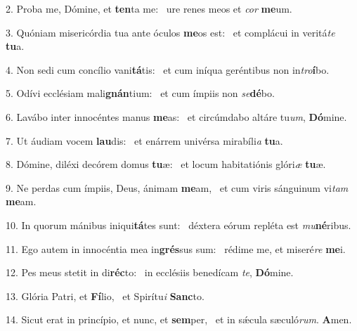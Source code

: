 2. Proba me, Dómine, et \textbf{ten}ta me: \ast\  ure renes meos et \textit{cor} \textbf{me}um.\

3. Quóniam misericórdia tua ante óculos \textbf{me}os est: \ast\  et complácui in veritá\textit{te} \textbf{tu}a.\

4. Non sedi cum concílio vani\textbf{tá}tis: \ast\  et cum iníqua geréntibus non in\textit{tro}\textbf{í}bo.\

5. Odívi ecclésiam mali\textbf{gnán}tium: \ast\  et cum ímpiis non \textit{se}\textbf{dé}bo.\

6. Lavábo inter innocéntes manus \textbf{me}as: \ast\  et circúmdabo altáre tu\textit{um}, \textbf{Dó}mine.\

7. Ut áudiam vocem \textbf{lau}dis: \ast\  et enárrem univérsa mirabíli\textit{a} \textbf{tu}a.\

8. Dómine, diléxi decórem domus \textbf{tu}æ: \ast\  et locum habitatiónis glóri\textit{æ} \textbf{tu}æ.\

9. Ne perdas cum ímpiis, Deus, ánimam \textbf{me}am, \ast\  et cum viris sánguinum vi\textit{tam} \textbf{me}am.\

10. In quorum mánibus iniqui\textbf{tá}tes sunt: \ast\  déxtera eórum repléta est \textit{mu}\textbf{né}ribus.\

11. Ego autem in innocéntia mea in\textbf{grés}sus sum: \ast\  rédime me, et miseré\textit{re} \textbf{me}i.\

12. Pes meus stetit in di\textbf{réc}to: \ast\  in ecclésiis benedícam \textit{te}, \textbf{Dó}mine.\

13. Glória Patri, et \textbf{Fí}lio, \ast\  et Spirítu\textit{i} \textbf{Sanc}to.\

14. Sicut erat in princípio, et nunc, et \textbf{sem}per, \ast\  et in sǽcula sæculó\textit{rum}. \textbf{A}men.\

